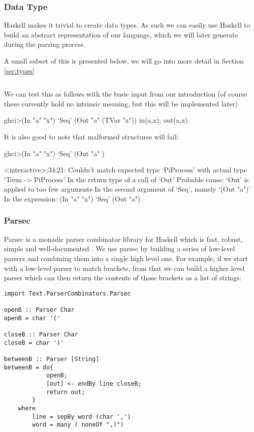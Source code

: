 \subsubsection{Data Type}
Haskell makes it trivial to create data types. As such we can easily use Haskell to build an abstract representation of our language, which we will later generate during the parsing process.

A small subset of this is presented below, we will go into more detail in Section \ref{sec:types}
    
\inputminted[linenos,frame=lines]{hs}{pi-calc.hs}

We can test this as follows with the basic input from our introduction (of course these currently hold no intrinsic meaning, but this will be implemented later)

\begin{code}
    ghci>(In "a" "x") `Seq' (Out "a" (TVar "x"))
    in(a,x);
    out(a,x)
\end{code}

It is also good to note that malformed structures will fail:

\begin{code}
    ghci>(In "a" "x") `Seq' (Out "a" )

    <interactive>:34:21:
        Couldn't match expected type `PiProcess'
        with actual type `Term -> PiProcess'
        In the return type of a call of `Out'
        Probable cause: `Out' is applied to too few arguments
        In the second argument of `Seq', namely `(Out "a")'
        In the expression: (In "a" "x") `Seq' (Out "a")
\end{code}

\subsubsection{Parsec}
\label{sec:bgparsing}

Parsec is a monadic parser combinator library for Haskell which is fast, robust, simple and well-documented \cite{lm01}. We use parsec by building a series of low-level parsers and combining them into a single high level one.
For example, if we start with a low-level parser to match brackets, from that we can build a higher level parser which can then return the contents of those brackets as a list of strings:

\begin{verbatim}
import Text.ParserCombinators.Parsec

openB :: Parser Char
openB = char '(' 

closeB :: Parser Char
closeB = char ')' 

betweenB :: Parser [String]
betweenB = do{
            openB;
            [out] <- endBy line closeB;
            return out;
        } 
    where
        line = sepBy word (char ',')
        word = many ( noneOf ",)")
\end{verbatim}

